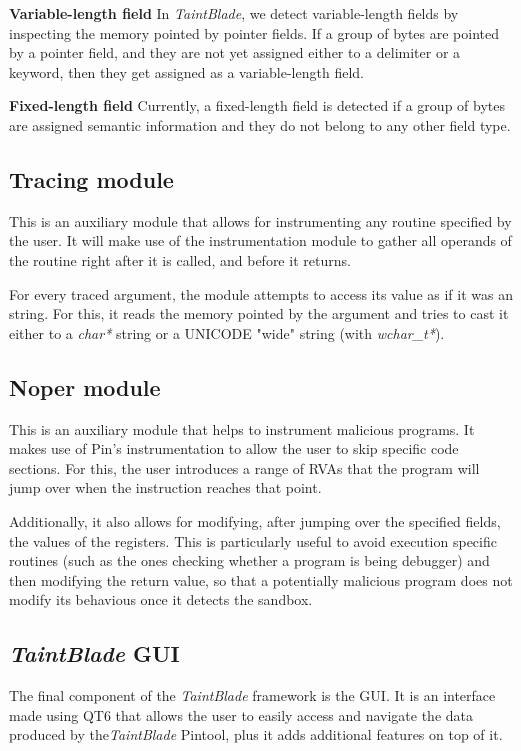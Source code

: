 \documentclass[conference]{IEEEtran}
\begin{document}
\textbf{Variable-length field} In \textit{TaintBlade}, we detect variable-length fields by inspecting the memory 
pointed by pointer fields. If a group of bytes are pointed by a pointer field, and they are not yet assigned either
to a delimiter or a keyword, then they get assigned as a variable-length field.

\textbf{Fixed-length field} Currently, a fixed-length field is detected if a group of bytes are assigned semantic
information and they do not belong to any other field type.


\subsection{Tracing module}
This is an auxiliary module that allows for instrumenting any routine specified by the user. It will
make use of the instrumentation module to gather all operands of the routine right after it is called,
and before it returns. 

For every traced argument, the module attempts to access its value as if it was an string.
For this, it reads the memory pointed by the argument and tries to cast it either to a 
\textit{char*} string or a UNICODE "wide" string (with \textit{wchar\_t*}).

\subsection{Noper module}
This is an auxiliary module that helps to instrument malicious programs. It makes use of 
Pin's instrumentation to allow the user to skip specific code sections. For this, the user
introduces a range of RVAs that the program will jump over when the instruction reaches that point.

Additionally, it also allows for modifying, after jumping over the specified fields, the values of the
registers. This is particularly useful to avoid execution specific routines (such as the ones checking
whether a program is being debugger) and then modifying the return value, so that a potentially
malicious program does not modify its behavious once it detects the sandbox.

\subsection{\textit{TaintBlade} GUI}
The final component of the \textit{TaintBlade} framework is the GUI. It is 
an interface made using QT6 that allows the user to easily access and navigate 
the data produced by the\textit{TaintBlade} Pintool, plus it adds additional 
features on top of it.
\end{document}
